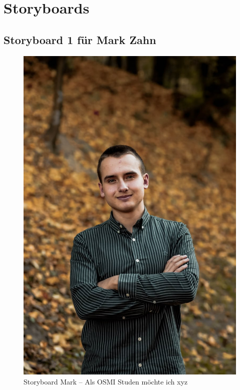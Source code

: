 \documentclass{article}
\begin{document}
\newpage

\section{Storyboards}

\subsection{Storyboard 1 für Mark Zahn}

\begin{figure}[h]
	\includegraphics[angle=90,width=\textwidth]{mark}
	\centering
	\caption{Storyboard Mark – Als OSMI Studen möchte ich xyz}
\end{figure}

\newpage
\end{document}
